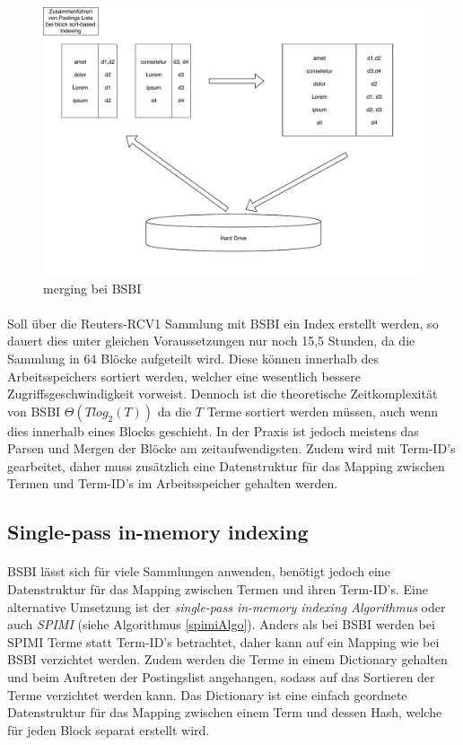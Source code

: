 \begin{figure}[ht]
  \includegraphics[width=\textwidth]{pdf/BSI_merging.pdf}
  \caption{merging bei BSBI}
  \label{bsiMerging}
\end{figure}

\paragraph{}
Soll über die Reuters-RCV1 Sammlung mit BSBI ein Index erstellt werden, so dauert dies unter gleichen Voraussetzungen nur noch 15,5 Stunden, da die Sammlung in 64 Blöcke aufgeteilt wird. Diese können innerhalb des Arbeitsspeichers sortiert werden, welcher eine wesentlich bessere Zugriffsgeschwindigkeit vorweist. Dennoch ist die theoretische Zeitkomplexität von BSBI $\Theta( T log_2 ( T))$ da die $T$ Terme sortiert werden müssen, auch wenn dies innerhalb eines Blocks geschieht. In der Praxis ist jedoch meistens das Parsen und Mergen der Blöcke am zeitaufwendigsten. Zudem wird mit Term-ID's gearbeitet,  daher muss zusätzlich eine Datenstruktur für das Mapping zwischen Termen und Term-ID's im Arbeitsspeicher gehalten werden.\par

\subsection{Single-pass in-memory indexing}
\paragraph{}
BSBI lässt sich für viele Sammlungen anwenden, benötigt jedoch eine Datenstruktur für das Mapping zwischen Termen und ihren Term-ID's. Eine alternative Umsetzung ist der \textit{single-pass in-memory indexing Algorithmus} oder auch \textit{SPIMI} (siehe Algorithmus \ref{spimiAlgo}). Anders als bei BSBI werden bei SPIMI Terme statt Term-ID's betrachtet, daher kann auf ein Mapping wie bei BSBI verzichtet werden. Zudem werden die Terme in einem Dictionary gehalten und beim Auftreten der Postingslist angehangen, sodass auf das Sortieren der Terme verzichtet werden kann. Das Dictionary ist eine einfach geordnete Datenstruktur für das Mapping zwischen einem Term und dessen Hash, welche für jeden Block separat erstellt wird.\par

